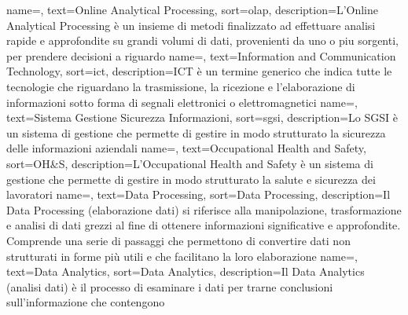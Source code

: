  {
    name=,
    text=Online Analytical Processing,
    sort=olap,
    description={L'Online Analytical Processing è un insieme di metodi finalizzato ad effettuare analisi rapide e approfondite su grandi volumi di dati, provenienti da uno o piu sorgenti, per prendere decisioni a riguardo}
}
 {
    name=,
    text=Information and Communication Technology,
    sort=ict,
    description={ICT è un termine generico che indica tutte le tecnologie che riguardano la trasmissione, la ricezione e l'elaborazione di informazioni sotto forma di segnali elettronici o elettromagnetici}
}
 {
    name=,
    text=Sistema Gestione Sicurezza Informazioni,
    sort=sgsi,
    description={Lo SGSI è un sistema di gestione che permette di gestire in modo strutturato la sicurezza delle informazioni aziendali}
}
 {
    name=,
    text=Occupational Health and Safety,
    sort=OH\&S,
    description={L'Occupational Health and Safety è un sistema di gestione che permette di gestire in modo strutturato la salute e sicurezza dei lavoratori}
}
{
    name=,
    text=Data Processing,
    sort=Data Processing,
    description={Il Data Processing (elaborazione dati) si riferisce alla manipolazione, trasformazione e analisi di dati grezzi al fine di ottenere informazioni significative e approfondite. Comprende una serie di passaggi che permettono di convertire dati non strutturati in forme più utili e che facilitano la loro elaborazione}
}
{
    name=,
    text=Data Analytics,
    sort=Data Analytics,
    description={Il Data Analytics (analisi dati) è il processo di esaminare i dati per trarne conclusioni sull'informazione che contengono}
}
